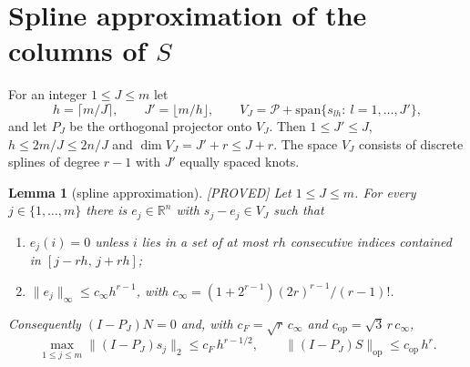 \documentclass[11pt]{article}
\newtheorem{lemma}{Lemma}
\theoremstyle{definition}
\theoremstyle{remark}
\newcommand{\R}{\mathbb{R}}
\newcommand{\cP}{\mathcal P}
\newcommand{\proved}{\textup{[PROVED]}}
\newcommand{\op}{\mathrm{op}}
\begin{document}
\section{Spline approximation of the columns of \texorpdfstring{$S$}{S}}\label{sec:F}

For an integer $1\le J\le m$ let
\begin{equation}\label{eq:VJ}
h=\lceil m/J\rceil,\qquad J'=\lfloor m/h\rfloor,\qquad V_J=\cP+\mathrm{span}\{s_{lh}:\ l=1,\dots,J'\},
\end{equation}
and let $P_J$ be the orthogonal projector onto $V_J$. Then $1\le J'\le J$, $h\le2m/J\le2n/J$ and $\dim V_J=J'+r\le J+r$. The space $V_J$ consists of discrete splines of degree $r-1$ with $J'$ equally spaced knots.

\begin{lemma}[spline approximation]\label{lem:F}\proved{}
Let $1\le J\le m$. For every $j\in\{1,\dots,m\}$ there is $e_j\in\R^n$ with $s_j-e_j\in V_J$ such that
\begin{enumerate}[label=(\roman*),itemsep=1pt,topsep=2pt]
\item $e_j(i)=0$ unless $i$ lies in a set of at most $rh$ consecutive indices contained in $[j-rh,\,j+rh]$;
\item $\|e_j\|_\infty\le c_\infty h^{r-1}$, with $c_\infty=(1+2^{r-1})(2r)^{r-1}/(r-1)!$.
\end{enumerate}
Consequently $(I-P_J)N=0$ and, with $c_F=\sqrt r\,c_\infty$ and $c_{\op}=\sqrt3\,r\,c_\infty$,
\begin{equation}\label{eq:F}
\max_{1\le j\le m}\|(I-P_J)s_j\|_2\le c_F\,h^{r-1/2},\qquad \|(I-P_J)S\|_{\op}\le c_{\op}\,h^{r}.
\end{equation}
\end{lemma}
\end{document}
